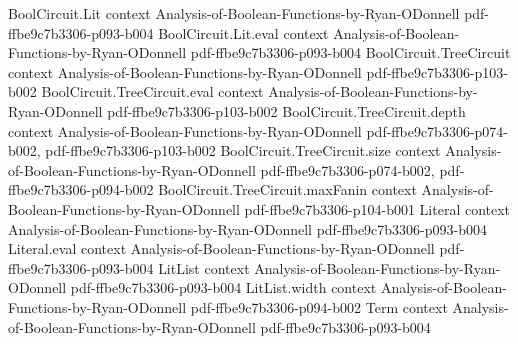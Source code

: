 \begin{lemma}
\label{LMN.circuit_reduction_ind_step}
\leanok
{}
\proofstep
  {BoolCircuit.Lit}
  {context}
  {Analysis-of-Boolean-Functions-by-Ryan-ODonnell}
  {pdf-ffbe9c7b3306-p093-b004}
\proofstep
  {BoolCircuit.Lit.eval}
  {context}
  {Analysis-of-Boolean-Functions-by-Ryan-ODonnell}
  {pdf-ffbe9c7b3306-p093-b004}
\proofstep
  {BoolCircuit.TreeCircuit}
  {context}
  {Analysis-of-Boolean-Functions-by-Ryan-ODonnell}
  {pdf-ffbe9c7b3306-p103-b002}
\proofstep
  {BoolCircuit.TreeCircuit.eval}
  {context}
  {Analysis-of-Boolean-Functions-by-Ryan-ODonnell}
  {pdf-ffbe9c7b3306-p103-b002}
\proofstep
  {BoolCircuit.TreeCircuit.depth}
  {context}
  {Analysis-of-Boolean-Functions-by-Ryan-ODonnell}
  {pdf-ffbe9c7b3306-p074-b002,
    pdf-ffbe9c7b3306-p103-b002}
\proofstep
  {BoolCircuit.TreeCircuit.size}
  {context}
  {Analysis-of-Boolean-Functions-by-Ryan-ODonnell}
  {pdf-ffbe9c7b3306-p074-b002,
    pdf-ffbe9c7b3306-p094-b002}
\proofstep
  {BoolCircuit.TreeCircuit.maxFanin}
  {context}
  {Analysis-of-Boolean-Functions-by-Ryan-ODonnell}
  {pdf-ffbe9c7b3306-p104-b001}
\proofstep
  {Literal}
  {context}
  {Analysis-of-Boolean-Functions-by-Ryan-ODonnell}
  {pdf-ffbe9c7b3306-p093-b004}
\proofstep
  {Literal.eval}
  {context}
  {Analysis-of-Boolean-Functions-by-Ryan-ODonnell}
  {pdf-ffbe9c7b3306-p093-b004}
\proofstep
  {LitList}
  {context}
  {Analysis-of-Boolean-Functions-by-Ryan-ODonnell}
  {pdf-ffbe9c7b3306-p093-b004}
\proofstep
  {LitList.width}
  {context}
  {Analysis-of-Boolean-Functions-by-Ryan-ODonnell}
  {pdf-ffbe9c7b3306-p094-b002}
\proofstep
  {Term}
  {context}
  {Analysis-of-Boolean-Functions-by-Ryan-ODonnell}
  {pdf-ffbe9c7b3306-p093-b004}

\end{lemma}
